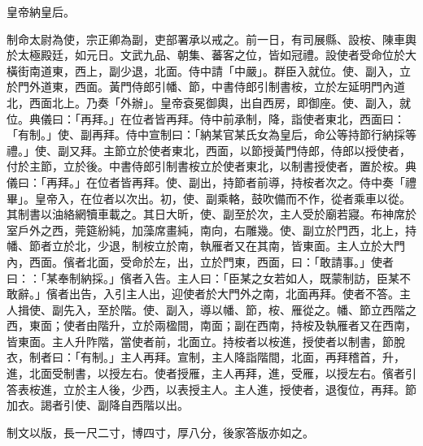 
\begin{pinyinscope}

 皇帝納皇后。



 制命太尉為使，宗正卿為副，吏部署承以戒之。前一日，有司展縣、設桉、陳車輿於太極殿廷，如元日。文武九品、朝集、蕃客之位，皆如冠禮。設使者受命位於大橫街南道東，西上，副少退，北面。侍中請「中嚴」。群臣入就位。使、副入，立於門外道東，西面。黃門侍郎引幡、節，中書侍郎引制書桉，立於左延明門內道北，西面北上。乃奏「外辦」。皇帝袞冕御輿，出自西房，即御座。使、副入，就位。典儀曰：「再拜。」在位者皆再拜。侍中前承制，降，詣使者東北，西面曰：「有制。」使、副再拜。侍中宣制曰：「納某官某氏女為皇后，命公等持節行納採等禮。」使、副又拜。主節立於使者東北，西面，以節授黃門侍郎，侍郎以授使者，付於主節，立於後。中書侍郎引制書桉立於使者東北，以制書授使者，置於桉。典儀曰：「再拜。」在位者皆再拜。使、副出，持節者前導，持桉者次之。侍中奏「禮畢」。皇帝入，在位者以次出。初，使、副乘輅，鼓吹備而不作，從者乘車以從。其制書以油絡網犢車載之。其日大昕，使、副至於次，主人受於廟若寢。布神席於室戶外之西，莞筵紛純，加藻席畫純，南向，右雕幾。使、副立於門西，北上，持幡、節者立於北，少退，制桉立於南，執雁者又在其南，皆東面。主人立於大門內，西面。儐者北面，受命於左，出，立於門東，西面，曰：「敢請事。」使者曰：：「某奉制納採。」儐者入告。主人曰：「臣某之女若如人，既蒙制訪，臣某不敢辭。」儐者出告，入引主人出，迎使者於大門外之南，北面再拜。使者不答。主人揖使、副先入，至於階。使、副入，導以幡、節，桉、雁從之。幡、節立西階之西，東面；使者由階升，立於兩楹間，南面；副在西南，持桉及執雁者又在西南，皆東面。主人升阼階，當使者前，北面立。持桉者以桉進，授使者以制書，節脫衣，制者曰：「有制。」主人再拜。宣制，主人降詣階間，北面，再拜稽首，升，進，北面受制書，以授左右。使者授雁，主人再拜，進，受雁，以授左右。儐者引答表桉進，立於主人後，少西，以表授主人。主人進，授使者，退復位，再拜。節加衣。謁者引使、副降自西階以出。



 制文以版，長一尺二寸，博四寸，厚八分，後家答版亦如之。




\end{pinyinscope}
